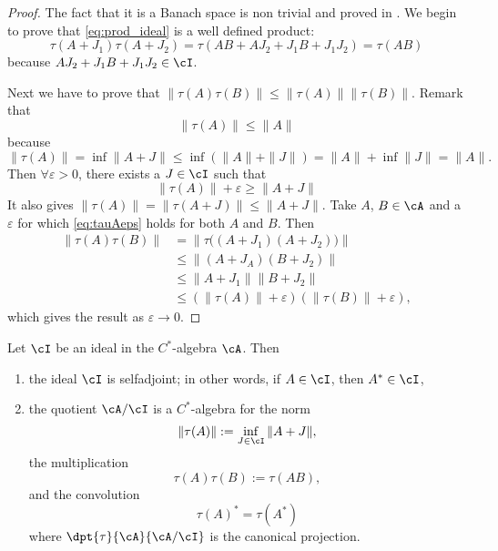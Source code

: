 \begin{proof}
The fact that it is a Banach space is non trivial and proved in \cite{thomaslassen}. We begin to prove that \eqref{eq:prod_ideal} is a well defined product:
\begin{equation}
   \tau(A+J_1)\tau(A+J_2)=\tau(AB+AJ_2+J_1B+J_1J_2)
                         =\tau(AB)
\end{equation}
because $AJ_2+J_1B+J_1J_2\in\cI$.

Next we have to prove that $\|\tau(A)\tau(B)\|\leq\|\tau(A)\|\|\tau(B)\|$. Remark that
\begin{equation} \label{eq:tauAA}
\|\tau(A)\|\leq\|A\|
\end{equation}
because 
\[
  \|\tau(A)\|=\inf\|A+J\|
             \leq\inf(\|A\|+\|J\|)
             =\|A\|+\inf\|J\|
             =\|A\|.
\]
Then $\forall\varepsilon>0$, there exists a $J\in\cI$ such that 
\begin{equation} \label{eq:tauAeps}
\|\tau(A)\|+\varepsilon\geq\|A+J\|
\end{equation}
It also gives $\|\tau(A)\|=\|\tau(A+J)\|\leq\|A+J\|$. Take $A$, $B\in\cA$ and a $\varepsilon$ for which \eqref{eq:tauAeps} holds for both $A$ and $B$. Then
\begin{equation}
\begin{split}
\|\tau(A)\tau(B)\|&=\|\tau\big( (A+J_1)(A+J_2)\big)\|\\
                  &\leq\|(A+J_A)(B+J_2)\|\\
                  &\leq\|A+J_1\|\|B+J_2\|\\
                  &\leq(\|\tau(A)\|+\varepsilon)(\|\tau(B)\|+\varepsilon),
\end{split}
\end{equation}
which gives the result as $\varepsilon\to 0$.

\end{proof}

\begin{theorem} \label{tho_idautadjquo}
Let $\cI$ be an ideal in the $C^*$-algebra $\cA$. Then

\begin{enumerate}
\item the ideal $\cI$ is selfadjoint; in other words, if $A\in\cI$, then $A^*\in\cI$,  \label{enuni}
\item the quotient $\cA/\cI$ is a $C^*$-algebra for the norm \label{enunii}
\[ 
  \| \tau(A)\|:=\inf_{J\in\cI}\| A+J \| ,
\]
the multiplication
\[ 
  \tau(A)\tau(B):=\tau(AB),
\]
and the convolution
\[ 
  \tau(A)^*=\tau(A^*)
\]
where $\dpt{\tau}{\cA}{\cA/\cI}$ is the canonical projection.

\end{enumerate}
\end{theorem}


